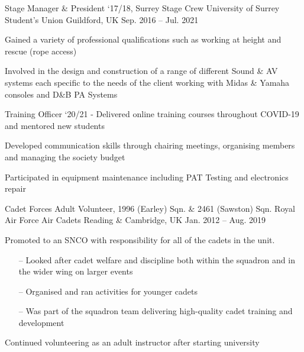 

\begin{cventries}

  \cventry
    {Stage Manager \& President `17/18, Surrey Stage Crew} %
    {University of Surrey Student's Union} %
    {Guildford, UK} %
    {Sep. 2016 -- Jul. 2021} %
    {
      \begin{cvitems} %
        \item Gained a variety of professional qualifications such as working at height and rescue (rope access)
        \item Involved in the design and construction of a range of different Sound \& AV systems each specific to the needs of the client working with Midas \& Yamaha consoles and D\&B PA Systems
        \item Training Officer `20/21 - Delivered online training courses throughout COVID-19 and mentored new students
        \item Developed communication skills through chairing meetings, organising members and managing the society budget
        \item Participated in equipment maintenance including PAT Testing and electronics repair
      \end{cvitems}
    }

  \cventry
    {Cadet Forces Adult Volunteer, 1996 (Earley) Sqn. \& 2461 (Sawston) Sqn.}
    {Royal Air Force Air Cadets}
    {Reading \& Cambridge, UK}
    {Jan. 2012 -- Aug. 2019}
    {
      \begin{cvitems}
        \item Promoted to an SNCO with responsibility for all of the cadets in the unit.
        \begin{itemize}
            \item[--] Looked after cadet welfare and discipline both within the squadron and in the wider wing on larger events
            \item[--] Organised and ran activities for younger cadets
            \item[--] Was part of the squadron team delivering high-quality cadet training and development
        \end{itemize}
        \item Continued volunteering as an adult instructor after starting university
      \end{cvitems}
    }

\end{cventries}

